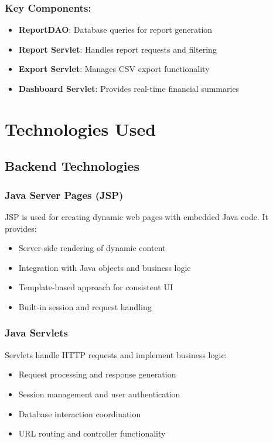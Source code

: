 \subsubsection{Key Components:}
\begin{itemize}
    \item \textbf{ReportDAO}: Database queries for report generation
    \item \textbf{Report Servlet}: Handles report requests and filtering
    \item \textbf{Export Servlet}: Manages CSV export functionality
    \item \textbf{Dashboard Servlet}: Provides real-time financial summaries
\end{itemize}

\section{Technologies Used}

\subsection{Backend Technologies}

\subsubsection{Java Server Pages (JSP)}
JSP is used for creating dynamic web pages with embedded Java code. It provides:
\begin{itemize}
    \item Server-side rendering of dynamic content
    \item Integration with Java objects and business logic
    \item Template-based approach for consistent UI
    \item Built-in session and request handling
\end{itemize}

\subsubsection{Java Servlets}
Servlets handle HTTP requests and implement business logic:
\begin{itemize}
    \item Request processing and response generation
    \item Session management and user authentication
    \item Database interaction coordination
    \item URL routing and controller functionality
\end{itemize}

